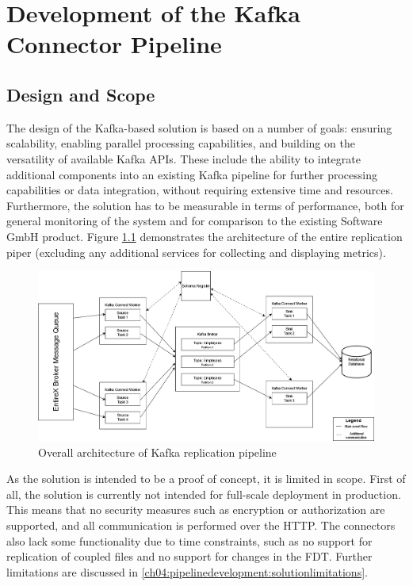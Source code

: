 \chapter{Development of the Kafka Connector Pipeline}
\label{ch04:pipelinedevelopment}

\section{Design and Scope}
The design of the Kafka-based solution is based on a number of goals: ensuring scalability, enabling parallel processing capabilities, and building on the versatility of available Kafka \ac{APIs}. These include the ability to integrate additional components into an existing Kafka pipeline for further processing capabilities or data integration, without requiring extensive time and resources. Furthermore, the solution has to be measurable in terms of performance, both for general monitoring of the system and for comparison to the existing Software GmbH product. Figure \ref{fig:chapter04:overallarchitecture} demonstrates the architecture of the entire replication piper (excluding any additional services for collecting and displaying metrics).

\begin{figure}[htbp]
 \centering
 \includegraphics[width=1\textwidth]{chapters/images/kafka pipeline overall architecture.drawio.png}
 \caption{Overall architecture of Kafka replication pipeline}
 \label{fig:chapter04:overallarchitecture}
\end{figure}

As the solution is intended to be a proof of concept, it is limited in scope. First of all, the solution is currently not intended for full-scale deployment in production. This means that no security measures such as encryption or authorization are supported, and all communication is performed over the \ac{HTTP}. The connectors also lack some functionality due to time constraints, such as no support for replication of coupled files and no support for changes in the \ac{FDT}. Further limitations are discussed in \ref{ch04:pipelinedevelopment:solutionlimitations}.

